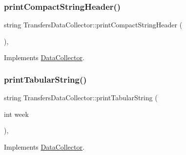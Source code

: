 \mbox{\label{classTransfersDataCollector_a29750b8b76fa82d70d4f472a0e36ceba_a29750b8b76fa82d70d4f472a0e36ceba}} 
\subsubsection{\texorpdfstring{print\+Compact\+String\+Header()}{printCompactStringHeader()}}
{\footnotesize\ttfamily string Transfers\+Data\+Collector\+::print\+Compact\+String\+Header (\begin{DoxyParamCaption}{ }\end{DoxyParamCaption})\hspace{0.3cm}{\ttfamily [override]}, {\ttfamily [virtual]}}



Implements \mbox{\hyperlink{classDataCollector_a98dcb4ec871d9c7fbf7545c64e5ccc67_a98dcb4ec871d9c7fbf7545c64e5ccc67}{Data\+Collector}}.

\mbox{\label{classTransfersDataCollector_a292b907e5c1000d8b3d868409637b9a6_a292b907e5c1000d8b3d868409637b9a6}} 
\subsubsection{\texorpdfstring{print\+Tabular\+String()}{printTabularString()}}
{\footnotesize\ttfamily string Transfers\+Data\+Collector\+::print\+Tabular\+String (\begin{DoxyParamCaption}\item[{int}]{week }\end{DoxyParamCaption})\hspace{0.3cm}{\ttfamily [override]}, {\ttfamily [virtual]}}



Implements \mbox{\hyperlink{classDataCollector_a397fccabe0223267eea8fc7cac0e59da_a397fccabe0223267eea8fc7cac0e59da}{Data\+Collector}}.

